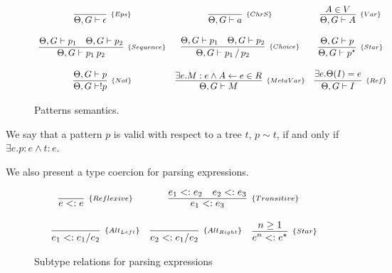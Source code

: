 \begin{figure*}[!ht]
    \[
        \begin{array}{ccc}
            \infer[_{\{Eps\}}]{\Theta, G \vdash \epsilon}{} &
            \infer[_{\{ChrS\}}]{\Theta, G \vdash a}{} &
            \infer[_{\{Var\}}]{\Theta, G \vdash A}{A \in V}
            \\ \\
            \infer[_{\{Sequence\}}]{\Theta, G \vdash p_1\:p_2}{\Theta, G \vdash p_1 & \Theta, G \vdash p_2} &
            \infer[_{\{Choice\}}]{\Theta, G \vdash p_1 \,/\, p_2}{\Theta, G \vdash p_1 & \Theta, G \vdash p_2} &
            \infer[_{\{Star\}}]{\Theta, G \vdash p^\star}{\Theta, G \vdash p} 
            \\ \\
            \infer[_{\{Not\}}]{\Theta, G \vdash !p}{\Theta, G \vdash p} &
            \infer[_{\{MetaVar\}}]{\Theta, G \vdash M}{\exists e. M : e \land A \leftarrow e \in R} &
            \infer[_{\{Ref\}}]{\Theta, G \vdash I}{\exists e. \Theta(I) = e}
        \end{array}
    \]
    \centering
    \caption{Patterns semantics.}
    \label{fig:pattern-semantics}
\end{figure*}

\begin{definition}
    We say that a pattern \(p\) is valid with respect to a tree \(t\), \(p \sim t\),
    if and only if \(\exists e . p : e \land t : e\).
\end{definition}

We also present a type coercion for parsing expressions.
\begin{figure*}[ht]
    \[
        \begin{array}{ccc}
            \infer[_{\{Reflexive\}}]{e <: e}{} &
            \multicolumn{2}{c}{
                \infer[_{\{Transitive\}}]{e_1 <: e_3}{e_1 <: e_2 & e_2 <: e_3}
            } \\ \\

            \infer[_{\{Alt_{Left}\}}]{e_1 <: e_1 / e_2}{} &
            \infer[_{\{Alt_{Right}\}}]{e_2 <: e_1 / e_2}{} &
            \infer[_{\{Star\}}]{e^n <: e^\star}{n \geq 1} 
        \end{array}
    \]
    \centering
    \caption{Subtype relations for parsing expressions}
    \label{fig:subtype-relations}
\end{figure*}

